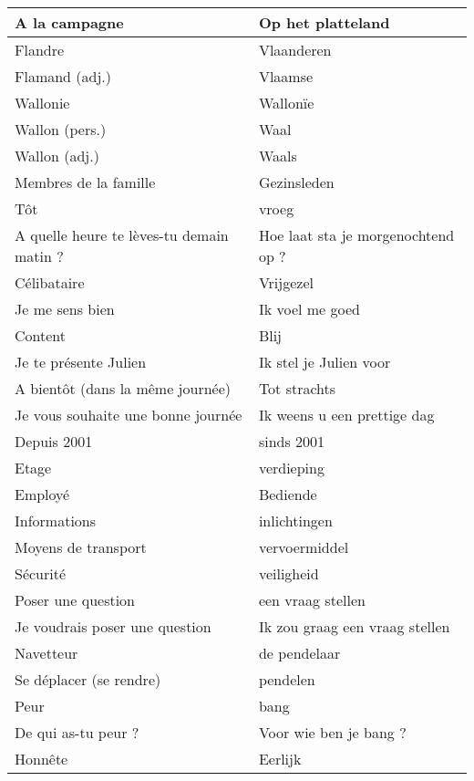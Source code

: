 \documentclass[a4paper]{article}
\begin{document}
\begin{center}
  \begin{tabular}{|l|l|}
    \hline
    A la campagne & Op het platteland\\
    \hline
    Flandre & Vlaanderen\\
    \hline
    Flamand (adj.) & Vlaamse\\
    \hline
    Wallonie & Wallonïe\\
    \hline
    Wallon (pers.) & Waal\\
    \hline
    Wallon (adj.) & Waals\\
    \hline
    Membres de la famille & Gezinsleden\\
    \hline
    Tôt & vroeg\\
    \hline
    A quelle heure te lèves-tu demain matin ? & Hoe laat sta je morgenochtend op ?\\
    \hline
    Célibataire & Vrijgezel\\
    \hline
    Je me sens bien & Ik voel me goed\\
    \hline
    Content & Blij\\
    \hline
    Je te présente Julien & Ik stel je Julien voor\\
    \hline
    A bientôt (dans la même journée) & Tot strachts\\
    \hline
    Je vous souhaite une bonne journée & Ik weens u een prettige dag\\
    \hline 
    Depuis 2001 & sinds 2001\\
    \hline
    Etage & verdieping\\
    \hline
    Employé & Bediende\\
    \hline
    Informations & inlichtingen\\
    \hline
    Moyens de transport & vervoermiddel\\
    \hline
    Sécurité & veiligheid\\
    \hline
    Poser une question & een vraag stellen\\
    \hline
    Je voudrais poser une question & Ik zou graag een vraag stellen\\
    \hline
    Navetteur & de pendelaar\\
    \hline
    Se déplacer (se rendre) & pendelen\\
    \hline
    Peur & bang\\
    \hline
    De qui as-tu peur ? & Voor wie ben je bang ?\\
    \hline
    Honnête & Eerlijk\\

\end{tabular}
\end{center}
\end{document}
